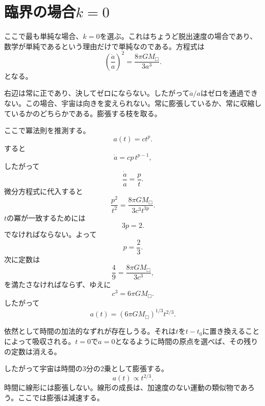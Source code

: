 \section{臨界の場合\(k=0\)}

ここで最も単純な場合、\(k=0\)を選ぶ。これはちょうど脱出速度の場合であり、数学が単純であるという理由だけで単純なのである。方程式は
\begin{equation}
\left(\frac{\dot a}{a}\right)^2=\frac{8\pi G M_{\Box}}{3a^3}.
\end{equation}
となる。

右辺は常に正であり、決してゼロにならない。したがって\(\dot a/a\)はゼロを通過できない。この場合、宇宙は向きを変えられない。常に膨張しているか、常に収縮しているかのどちらかである。膨張する枝を取る。

ここで冪法則を推測する。
\begin{equation}
a(t)=ct^p.
\end{equation}
すると
\begin{equation}
\dot a = cp\,t^{p-1},
\end{equation}
したがって
\begin{equation}
\frac{\dot a}{a}=\frac{p}{t}.
\end{equation}
微分方程式に代入すると
\begin{equation}
\frac{p^2}{t^2}=\frac{8\pi G M_{\Box}}{3c^3t^{3p}}.
\end{equation}
\(t\)の冪が一致するためには
\begin{equation}
3p=2.
\end{equation}
でなければならない。よって
\begin{equation}
p=\frac{2}{3}.
\end{equation}
次に定数は
\begin{equation}
\frac{4}{9}=\frac{8\pi G M_{\Box}}{3c^3},
\end{equation}
を満たさなければならず、ゆえに
\begin{equation}
c^3=6\pi G M_{\Box}.
\end{equation}
したがって
\begin{equation}
a(t)=\left(6\pi G M_{\Box}\right)^{1/3}t^{2/3}.
\end{equation}

依然として時間の加法的なずれが存在しうる。それは\(t\)を\(t-t_0\)に置き換えることによって吸収される。\(t=0\)で\(a=0\)となるように時間の原点を選べば、その残りの定数は消える。

したがって宇宙は時間の3分の2乗として膨張する。
\begin{equation}
a(t)\propto t^{2/3}.
\end{equation}
時間に線形には膨張しない。線形の成長は、加速度のない運動の類似物であろう。ここでは膨張は減速する。

